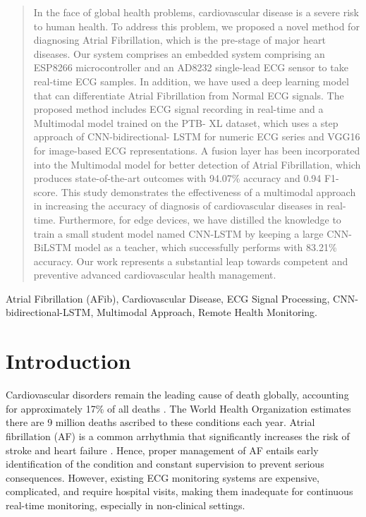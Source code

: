\documentclass[conference]{IEEEtran}
\begin{document}
\begin{abstract}

In the face of global health problems, cardiovascular disease is a severe risk to human health. To address this problem, we proposed a novel method for diagnosing Atrial Fibrillation, which is the pre-stage of major heart diseases. Our system comprises an embedded system comprising an ESP8266 microcontroller and an AD8232 single-lead ECG sensor to take real-time ECG samples. In addition, we have used a deep learning model that can differentiate Atrial Fibrillation from Normal ECG signals. The proposed method includes ECG signal recording in real-time and a Multimodal model trained on the PTB- XL dataset, which uses a step approach of CNN-bidirectional- LSTM for numeric ECG series and VGG16 for image-based ECG representations. A fusion layer has been incorporated into the Multimodal model for better detection of Atrial Fibrillation, which produces state-of-the-art outcomes with 94.07\% accuracy and 0.94 F1-score. This study demonstrates the effectiveness of a multimodal approach in increasing the accuracy of diagnosis of cardiovascular diseases in real-time. Furthermore, for edge devices, we have distilled the knowledge to train a small student model named CNN-LSTM by keeping a large CNN-BiLSTM model as a teacher, which successfully performs with 83.21\% accuracy. Our work represents a substantial leap towards competent and preventive advanced cardiovascular health management. 

\end{abstract}

\begin{IEEEkeywords}
Atrial Fibrillation (AFib),
Cardiovascular Disease,
ECG Signal Processing,
CNN-bidirectional-LSTM,
Multimodal Approach,
Remote Health Monitoring.
\end{IEEEkeywords}

\section{Introduction}
Cardiovascular disorders remain the leading cause of death globally, accounting for approximately 17\% of all deaths \cite{drozd2021causes}. The World Health Organization estimates there are 9 million deaths ascribed to these conditions each year. Atrial fibrillation (AF) is a common arrhythmia that significantly increases the risk of stroke and heart failure \cite{chung2020atrial}. Hence, proper management of AF entails early identification of the condition and constant supervision to prevent serious consequences. However, existing ECG monitoring systems are expensive, complicated, and require hospital visits, making them inadequate for continuous real-time monitoring, especially in non-clinical settings.
\end{document}
